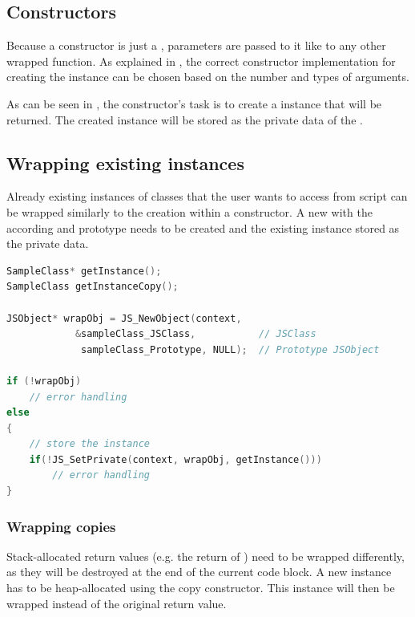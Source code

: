 \subsection{Constructors}

Because a constructor is just a ,  parameters are passed to it like to any other wrapped function. As explained in , the correct constructor implementation for creating the  instance can be chosen based on the number and types of arguments.

As can be seen in , the constructor's task is to create a  instance that will be returned. The created  instance will be stored as the private data of the .

\subsection{Wrapping existing instances}

Already existing instances of  classes that the user wants to access from script can be wrapped similarly to the creation within a constructor. A new  with the according  and prototype needs to be created and the existing instance stored as the private data.

\SingleSpacing
\begin{lstlisting}[language=C++, caption=Wrapping an instance]
SampleClass* getInstance();
SampleClass getInstanceCopy();

JSObject* wrapObj = JS_NewObject(context, 
			&sampleClass_JSClass,           // JSClass
			 sampleClass_Prototype, NULL);  // Prototype JSObject
			 
if (!wrapObj)
	// error handling
else
{
	// store the instance
	if(!JS_SetPrivate(context, wrapObj, getInstance()))
		// error handling
}

\end{lstlisting}
\OnehalfSpacing

\subsubsection{Wrapping copies}
\label{sec:WrappingCopies}

Stack-allocated return values (e.g. the return of ) need to be wrapped differently, as they will be destroyed at the end of the current code block. A new instance has to be heap-allocated using the copy constructor. This instance will then be wrapped instead of the original return value.

